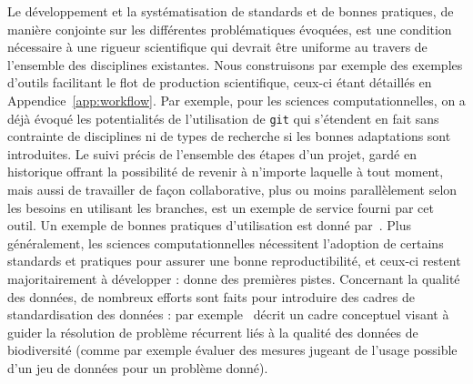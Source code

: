 Le développement et la systématisation de standards et de bonnes pratiques, de manière conjointe sur les différentes problématiques évoquées, est une condition nécessaire à une rigueur scientifique qui devrait être uniforme au travers de l'ensemble des disciplines existantes. Nous construisons par exemple des exemples d'outils facilitant le flot de production scientifique, ceux-ci étant détaillés en Appendice~\ref{app:workflow}. Par exemple, pour les sciences computationnelles, on a déjà évoqué les potentialités de l'utilisation de \texttt{git} qui s'étendent en fait sans contrainte de disciplines ni de types de recherche si les bonnes adaptations sont introduites. Le suivi précis de l'ensemble des étapes d'un projet, gardé en historique offrant la possibilité de revenir à n'importe laquelle à tout moment, mais aussi de travailler de façon collaborative, plus ou moins parallèlement selon les besoins en utilisant les branches, est un exemple de service fourni par cet outil. Un exemple de bonnes pratiques d'utilisation est donné par~\cite{10.1371/journal.pcbi.1004947}. Plus généralement, les sciences computationnelles nécessitent l'adoption de certains standards et pratiques pour assurer une bonne reproductibilité, et ceux-ci restent majoritairement à développer : \cite{wilson2017good} donne des premières pistes. Concernant la qualité des données, de nombreux efforts sont faits pour introduire des cadres de standardisation des données : par exemple~\cite{10.1371/journal.pone.0178731} décrit un cadre conceptuel visant à guider la résolution de problème récurrent liés à la qualité des données de biodiversité (comme par exemple évaluer des mesures jugeant de l'usage possible d'un jeu de données pour un problème donné).



